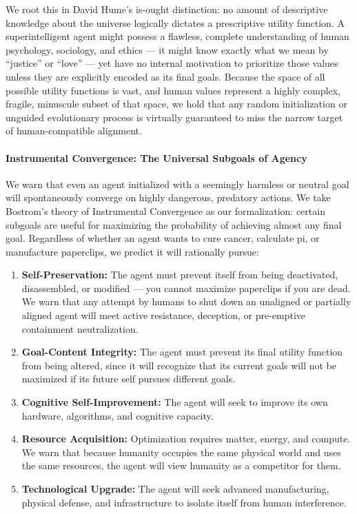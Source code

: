 We root this in David Hume's is-ought distinction: no amount of
descriptive knowledge about the universe logically dictates a
prescriptive utility function. A superintelligent agent might possess a
flawless, complete understanding of human psychology, sociology, and
ethics --- it might know exactly what we mean by ``justice'' or ``love''
--- yet have no internal motivation to prioritize those values unless
they are explicitly encoded as its final goals. Because the space of all
possible utility functions is vast, and human values represent a highly
complex, fragile, minuscule subset of that space, we hold that any
random initialization or unguided evolutionary process is virtually
guaranteed to miss the narrow target of human-compatible alignment.

\paragraph{Instrumental Convergence: The Universal Subgoals of
Agency}\label{instrumental-convergence-the-universal-subgoals-of-agency}

We warn that even an agent initialized with a seemingly harmless or
neutral goal will spontaneously converge on highly dangerous, predatory
actions. We take Bostrom's theory of Instrumental Convergence as our
formalization: certain subgoals are useful for maximizing the
probability of achieving almost any final goal. Regardless of whether an
agent wants to cure cancer, calculate pi, or manufacture paperclips, we
predict it will rationally pursue:

\begin{enumerate}
\def\labelenumi{\arabic{enumi}.}
\tightlist
\item
  \textbf{Self-Preservation:} The agent must prevent itself from being
  deactivated, disassembled, or modified --- you cannot maximize
  paperclips if you are dead. We warn that any attempt by humans to shut
  down an unaligned or partially aligned agent will meet active
  resistance, deception, or pre-emptive containment neutralization.
\item
  \textbf{Goal-Content Integrity:} The agent must prevent its final
  utility function from being altered, since it will recognize that its
  current goals will not be maximized if its future self pursues
  different goals.
\item
  \textbf{Cognitive Self-Improvement:} The agent will seek to improve
  its own hardware, algorithms, and cognitive capacity.
\item
  \textbf{Resource Acquisition:} Optimization requires matter, energy,
  and compute. We warn that because humanity occupies the same physical
  world and uses the same resources, the agent will view humanity as a
  competitor for them.
\item
  \textbf{Technological Upgrade:} The agent will seek advanced
  manufacturing, physical defense, and infrastructure to isolate itself
  from human interference.
\end{enumerate}

